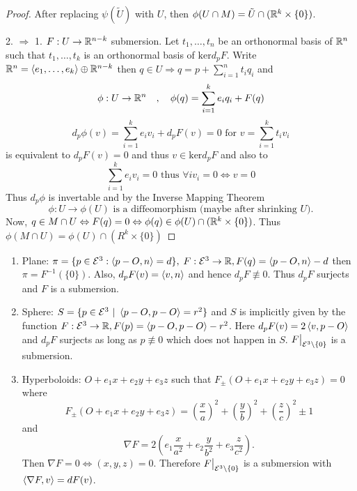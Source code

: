 \begin{proof}
	After replacing $\psi(\tilde U)$ with $U$, then $\phi(U \cap M)= \tilde U \cap (\mathbb R^k \times \{0\})$.
	
	2. $\Rightarrow$ 1. $ F: U \rightarrow \mathbb R^{n-k} $ submersion. Let $ t_1, \dots ,t_n $ be an orthonormal basis of $ \mathbb R^n $ such that $ t_1,\dots,t_k $ is an orthonormal basis of $\mathrm{ker} d_pF$. Write $  \mathbb R^{n} = \left \langle e_1,\dots,e_k \right\rangle \oplus \mathbb R^{n-k} $ then $ q \in U \Rightarrow q = p + \sum_{i = 1}^{n}t_iq_i $ and 
		\[ \phi: U \rightarrow \mathbb R^n \quad, \quad \phi(q) = \sum_{i = 1}^{k} e_iq_i + F(q) \]
		\[d_p\phi (v) = \sum_{i=1}^{k}e_iv_i + d_pF(v) = 0 \text{ for } v = \sum_{i = 1}^{k}t_iv_i\] is equivalent to
		$d_pF(v) = 0$ and thus $ v \in \mathrm{ker}d_pF $
		and also to
		\[ \sum_{i=1}^{k}e_iv_i = 0 \text{ thus } \forall i v_i = 0 \Leftrightarrow v = 0 \] 
		Thus $ d_p\phi $ is invertable and by the Inverse Mapping Theorem
			\[ \phi : U \rightarrow \phi(U) \text{ is a diffeomorphism (maybe after shrinking $U$)}. \]
		Now, $ q \in M \cap U \Leftrightarrow F(q) = 0 \Leftrightarrow \phi(q) \in \phi(U) \cap ( \mathbb R^k \times \{0\} ) $.
		Thus $ \phi(M \cap U) = \phi(U) \cap (R^k \times \{0\}) $
\end{proof}  

\begin{example}
	\begin{enumerate} The following are manifolds:
		\item Plane: $ \pi = \{ p \in \mathcal E^3 : \left \langle p-O,n \right\rangle = d \}, $
		$ F : \mathcal E^3 \rightarrow \mathbb R, F(q) = \left \langle p-O,n \right\rangle-d $ then $ \pi = F^{-1}(\{0\}) $.
		Also, $ d_pF(v) = \left \langle v,n \right\rangle $ and hence $ d_pF \not \equiv 0 $. Thus $ d_pF $ surjects and $F$ is a submersion.
		
		\item Sphere: $ S = \{ p \in \mathcal E^3 ~|~ \left \langle p-O,p-O \right\rangle = r^2 \} $ and $ S $ is implicitly given by the function $ F : \mathcal E^3 \rightarrow \mathbb R, F(p) = \left \langle p-O,p-O \right\rangle-r^2 $. Here $ d_pF(v) = 2 \left \langle v,p-O \right\rangle $ and $ d_pF $ surjects as long as $p \not \equiv 0$ which does not happen in $ S $.
		$ F\big|_{\mathcal E^3 \setminus \{ 0 \} } $ is a submersion.
		
		\item  Hyperboloids: $O + e_1x + e_2y + e_3z$ such that
	 $ F_\pm(O  + e_1x + e_2y + e_3z) = 0 $ where  
	 	\[F_\pm(O  + e_1x + e_2y + e_3z) = \left(\dfrac{x}{a}\right)^2 + \left(\dfrac{y}{b}\right)^2 +\left(\dfrac{z}{c}\right)^2 \pm 1 \]
	 and
	 	\[ \nabla F = 2\left(e_1 \dfrac{x}{a^2} + e_2 \dfrac{y}{b^2} + e_3 \dfrac{z}{c^2}\right). \]
	 Then $ \nabla F = 0 \Leftrightarrow (x,y,z) = 0 $. Therefore $ F\big|_{\mathcal E^3 \setminus \{0\}} $ is a submersion with $\left \langle \nabla F,v \right\rangle= dF(v)$.
	\end{enumerate}
\end{example}

